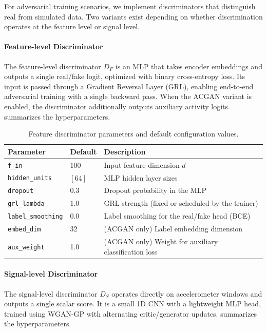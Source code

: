 For adversarial training scenarios, we implement discriminators that distinguish real from simulated data. Two variants exist depending on whether discrimination operates at the feature level or signal level.

\paragraph{Feature-level Discriminator}
The feature-level discriminator $D_F$ is an MLP that takes encoder embeddings and outputs a single real/fake logit, optimized with binary cross-entropy loss. Its input is passed through a Gradient Reversal Layer (GRL), enabling end-to-end adversarial training with a single backward pass. When the ACGAN variant is enabled, the discriminator additionally outputs auxiliary activity logits.  summarizes the hyperparameters.

\begin{table}[!t]
\centering
\caption{Feature discriminator parameters and default configuration values.}
\label{tab:df-params}
\begin{tabular}{llp{6.5cm}}
\hline
\textbf{Parameter} & \textbf{Default} & \textbf{Description} \\
\hline
\texttt{f\_in} & 100 & Input feature dimension $d$ \\
\texttt{hidden\_units} & $[64]$ & MLP hidden layer sizes \\
\texttt{dropout} & 0.3 & Dropout probability in the MLP \\
\texttt{grl\_lambda} & 1.0 & GRL strength (fixed or scheduled by the trainer) \\
\texttt{label\_smoothing} & 0.0 & Label smoothing for the real/fake head (BCE) \\
\texttt{embed\_dim} & 32 & (ACGAN only) Label embedding dimension \\
\texttt{aux\_weight} & 1.0 & (ACGAN only) Weight for auxiliary classification loss \\
\hline
\end{tabular}
\end{table}

\paragraph{Signal-level Discriminator}
The signal-level discriminator $D_S$ operates directly on accelerometer windows and outputs a single scalar score. It is a small 1D CNN with a lightweight MLP head, trained using WGAN-GP \cite{arjovsky2017wasserstein, gulrajani2017improved} with alternating critic/generator updates.  summarizes the hyperparameters.


